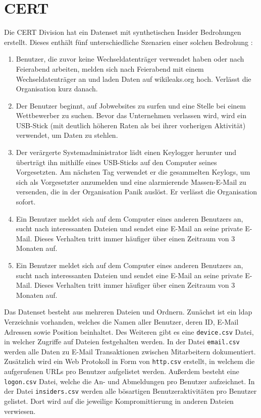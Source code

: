 \documentclass[
    12pt, %
    DIV10,
    ngerman, %
    a4paper, %
    oneside, %
    titlepage, %
    parskip=half, %
    headings=normal, %
    listof=totoc, %
    bibliography=totoc, %
    index=totoc, %
    captions=tableheading, %
    final %
]{scrreprt}
\begin{document}
\section{CERT}
Die CERT Division hat ein Datenset mit synthetischen Insider Bedrohungen erstellt. Dieses enthält fünf unterschiedliche Szenarien einer solchen Bedrohung \parencite{glasser2013bridging}:
\begin{enumerate}
\item Benutzer, die zuvor keine Wechseldatenträger verwendet haben oder nach Feierabend arbeiten, melden sich nach Feierabend mit einem Wechseldatenträger an und laden Daten auf wikileaks.org hoch. Verlässt die Organisation kurz danach.
\item Der Benutzer beginnt, auf Jobwebsites zu surfen und eine Stelle bei einem Wettbewerber zu suchen. Bevor das Unternehmen verlassen wird, wird ein USB-Stick (mit deutlich höheren Raten als bei ihrer vorherigen Aktivität) verwendet, um Daten zu stehlen.
\item Der verärgerte Systemadministrator lädt einen Keylogger herunter und überträgt ihn mithilfe eines USB-Sticks auf den Computer seines Vorgesetzten. Am nächsten Tag verwendet er die gesammelten Keylogs, um sich als Vorgesetzter anzumelden und eine alarmierende Massen-E-Mail zu versenden, die in der Organisation Panik auslöst. Er verlässt die Organisation sofort.
\item Ein Benutzer meldet sich auf dem Computer eines anderen Benutzers an, sucht nach interessanten Dateien und sendet eine E-Mail an seine private E-Mail. Dieses Verhalten tritt immer häufiger über einen Zeitraum von 3 Monaten auf.
\item Ein Benutzer meldet sich auf dem Computer eines anderen Benutzers an, sucht nach interessanten Dateien und sendet eine E-Mail an seine private E-Mail. Dieses Verhalten tritt immer häufiger über einen Zeitraum von 3 Monaten auf.
\end{enumerate}
Das Datenset besteht aus mehreren Dateien und Ordnern. Zunächst ist ein \ac{ldap} Verzeichnis vorhanden, welches die Namen aller Benutzer, deren ID, E-Mail Adressen sowie Position beinhaltet. Des Weiteren gibt es eine \texttt{device.csv} Datei, in welcher Zugriffe auf Dateien festgehalten werden. In der Datei \texttt{email.csv} werden alle Daten zu E-Mail Transaktionen zwischen Mitarbeitern dokumentiert. Zusätzlich wird ein Web Protokoll in Form von \texttt{http.csv} erstellt, in welchem die aufgerufenen URLs pro Benutzer aufgelistet werden. Au{\ss}erdem besteht eine \texttt{logon.csv} Datei, welche die An- und Abmeldungen pro Benutzer aufzeichnet. In der Datei \texttt{insiders.csv} werden alle bösartigen Benutzeraktivitäten pro Benutzer gelistet. Dort wird auf die jeweilige Kompromittierung in anderen Dateien verwiesen.
\end{document}
